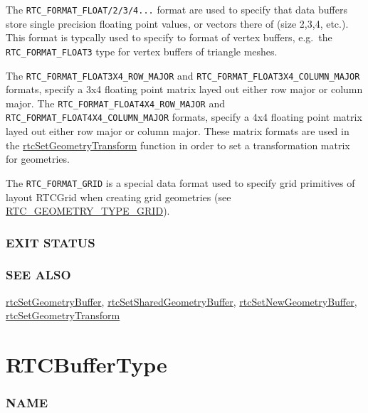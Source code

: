 The \texttt{RTC\_FORMAT\_FLOAT/2/3/4...} format are used to specify that
data buffers store single precision floating point values, or vectors
there of (size 2,3,4, etc.). This format is typcally used to specify to
format of vertex buffers, e.g.~the \texttt{RTC\_FORMAT\_FLOAT3} type for
vertex buffers of triangle meshes.

The \texttt{RTC\_FORMAT\_FLOAT3X4\_ROW\_MAJOR} and
\texttt{RTC\_FORMAT\_FLOAT3X4\_COLUMN\_MAJOR} formats, specify a 3x4
floating point matrix layed out either row major or column major. The
\texttt{RTC\_FORMAT\_FLOAT4X4\_ROW\_MAJOR} and
\texttt{RTC\_FORMAT\_FLOAT4X4\_COLUMN\_MAJOR} formats, specify a 4x4
floating point matrix layed out either row major or column major. These
matrix formats are used in the
\hyperref[rtcsetgeometrytransform]{rtcSetGeometryTransform} function in
order to set a transformation matrix for geometries.

The \texttt{RTC\_FORMAT\_GRID} is a special data format used to specify
grid primitives of layout RTCGrid when creating grid geometries (see
\hyperref[rtc_geometry_type_grid]{RTC\_GEOMETRY\_TYPE\_GRID}).

\subsubsection{EXIT STATUS}\label{exit-status}

\subsubsection{SEE ALSO}\label{see-also}

\hyperref[rtcsetgeometrybuffer]{rtcSetGeometryBuffer},
\hyperref[rtcsetsharedgeometrybuffer]{rtcSetSharedGeometryBuffer},
\hyperref[rtcsetnewgeometrybuffer]{rtcSetNewGeometryBuffer},
\hyperref[rtcsetgeometrytransform]{rtcSetGeometryTransform}

\pagebreak

\section{RTCBufferType}\label{rtcbuffertype}

\subsubsection{NAME}\label{name}

\begin{Shaded}
\begin{Highlighting}[]
\OperatorTok{{-}}
\end{Highlighting}
\end{Shaded}

